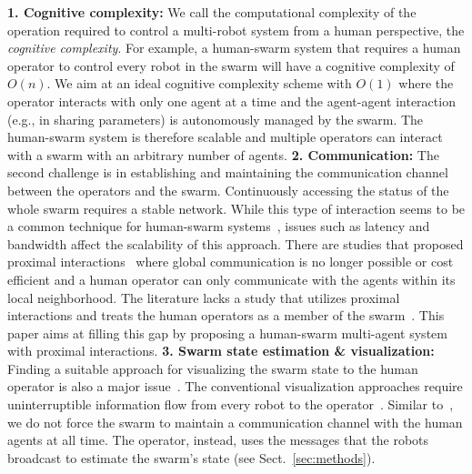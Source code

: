 \documentclass[runningheads]{llncs}%
\begin{document}
\textbf{1. Cognitive complexity:} We call the computational complexity of the operation required to control a multi-robot system from a human perspective, the \textit{{cognitive complexity}}. For example, a human-swarm system that requires a human operator to control every robot in the swarm will have a cognitive complexity of $O(n)$. We aim at an ideal cognitive complexity scheme with $O(1)$ where the operator interacts with only one agent at a time and the agent-agent interaction (e.g., in sharing parameters) is autonomously managed by the swarm. The human-swarm system is therefore scalable and multiple operators can interact with a swarm with an arbitrary number of agents. 
\textbf{2. Communication: }
The second challenge is in establishing and maintaining the {communication} channel between the operators and the swarm. 
Continuously accessing the status of the whole swarm requires a stable network. While this type of interaction seems to be a common technique for human-swarm systems~\cite{levillain2018more,ashcraft2019moderating}, issues such as latency and bandwidth affect the scalability of this approach. There are studies that proposed proximal interactions~\cite{naghsh2008analysis,alboul2008mixed} where global communication is no longer possible or cost efficient and a human operator can only communicate with the agents within its local neighborhood. The literature lacks a study that utilizes proximal interactions and treats the human operators as a member of the swarm~\cite{adams2018swarm}. This paper aims at filling this gap by proposing a human-swarm multi-agent system with proximal interactions. %
\textbf{3. Swarm state estimation \& visualization:}
Finding a suitable approach for visualizing the swarm state to the human operator is also a major issue~\cite{tabibian2014towards,sycara2015abstraction}. The conventional visualization approaches require uninterruptible information flow from every robot to the operator~\cite{capelli2019communication}. Similar to~\cite{matsuka2019distributed,cain2019human}, we do not force the swarm to maintain a communication channel with the human agents at all time. The operator, instead, uses the messages that the robots broadcast to estimate the swarm's state (see Sect.~\ref{sec:methods}). 
\end{document}
